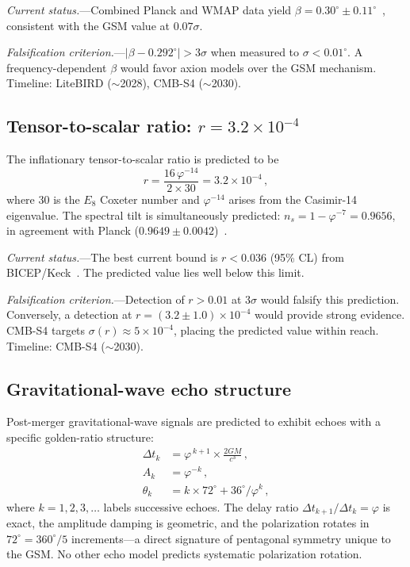 \documentclass[aps,prl,twocolumn,superscriptaddress,nofootinbib]{revtex4-2}
\newcommand{\vp}{\varphi}
\begin{document}
\emph{Current status.}---Combined Planck and WMAP data yield
$\beta = 0.30^\circ \pm 0.11^\circ$~\cite{minami2020,eskilt2022},
consistent with the GSM value at $0.07\sigma$.

\emph{Falsification criterion.}---$|\beta - 0.292^\circ| > 3\sigma$ when
measured to $\sigma < 0.01^\circ$.  A frequency-dependent $\beta$ would
favor axion models over the GSM mechanism.
Timeline: LiteBIRD ($\sim$2028), CMB-S4 ($\sim$2030).

\subsection{Tensor-to-scalar ratio: $r = 3.2 \times 10^{-4}$}
\label{sec:tensorscalar}

The inflationary tensor-to-scalar ratio is predicted to be
\begin{equation}
  r = \frac{16\,\vp^{-14}}{2 \times 30} = 3.2 \times 10^{-4}\,,
  \label{eq:rts}
\end{equation}
where 30 is the $E_8$ Coxeter number and $\vp^{-14}$ arises from the
Casimir-14 eigenvalue.  The spectral tilt is simultaneously predicted:
$n_s = 1 - \vp^{-7} = 0.9656$, in agreement with Planck
($0.9649 \pm 0.0042$)~\cite{planck2018}.

\emph{Current status.}---The best current bound is $r < 0.036$ (95\% CL)
from BICEP/Keck~\cite{bicepkeck2021}.  The predicted value lies well below
this limit.

\emph{Falsification criterion.}---Detection of $r > 0.01$ at $3\sigma$
would falsify this prediction.  Conversely, a detection at
$r = (3.2 \pm 1.0) \times 10^{-4}$ would provide strong evidence.
CMB-S4 targets $\sigma(r) \approx 5 \times 10^{-4}$, placing the
predicted value within reach.  Timeline: CMB-S4 ($\sim$2030).

\subsection{Gravitational-wave echo structure}
\label{sec:gwechoes}

Post-merger gravitational-wave signals are predicted to exhibit echoes with
a specific golden-ratio structure:
\begin{align}
  \Delta t_k &= \vp^{\,k+1} \times \frac{2GM}{c^3}\,,
  \label{eq:echo_delay} \\
  A_k &= \vp^{-k}\,,
  \label{eq:echo_amp} \\
  \theta_k &= k \times 72^\circ + 36^\circ/\vp^k\,,
  \label{eq:echo_pol}
\end{align}
where $k = 1, 2, 3, \ldots$ labels successive echoes.  The delay ratio
$\Delta t_{k+1}/\Delta t_k = \vp$ is exact, the amplitude damping is
geometric, and the polarization rotates in $72^\circ = 360^\circ/5$
increments---a direct signature of pentagonal symmetry unique to the GSM.
No other echo model predicts systematic polarization rotation.
\end{document}
